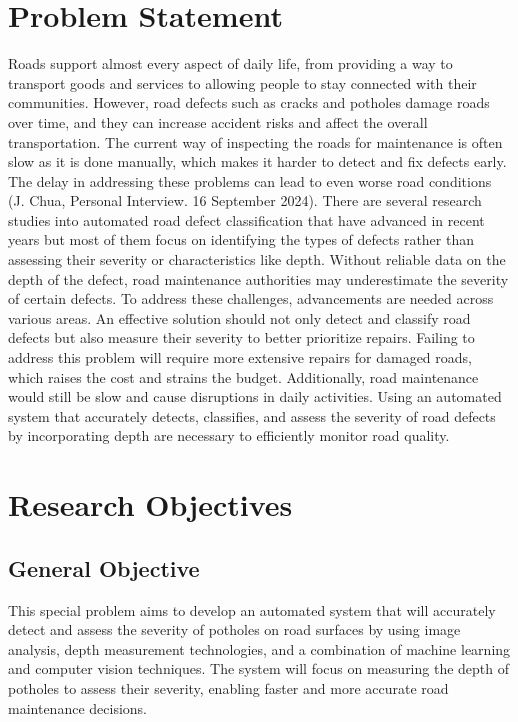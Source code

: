 \section{Problem Statement}
Roads support almost every aspect of daily life, from providing a way to transport goods and services to allowing people to stay connected with their communities. However, road defects such as cracks and potholes damage roads over time, and they can increase accident risks and affect the overall transportation. The current way of inspecting the roads for maintenance is often slow as it is done manually, which makes it harder to detect and fix defects early. The delay in addressing these problems can lead to even worse road conditions (J. Chua, Personal Interview. 16 September 2024). There are several research studies into automated road defect classification that have advanced in recent years but most of them focus on identifying the types of defects rather than assessing their severity or characteristics like depth. Without reliable data on the depth of the defect, road maintenance authorities may underestimate the severity of certain defects. To address these challenges, advancements are needed across various areas. An effective solution should not only detect and classify road defects but also measure their severity to better prioritize repairs. Failing to address this problem will require more extensive repairs for damaged roads, which raises the cost and strains the budget. Additionally, road maintenance would still be slow and cause disruptions in daily activities. Using an automated system that accurately detects, classifies, and assess the severity of road defects by incorporating depth are necessary to efficiently monitor road quality.


\section{Research Objectives}
\label{sec:researchobjectives}

\subsection{General Objective}
\label{sec:generalobjective}

This special problem aims to develop an automated system that will accurately detect and assess the severity of potholes on road surfaces by using image analysis, depth measurement technologies, and a combination of machine learning and computer vision techniques. The system will focus on measuring the depth of potholes to assess their severity, enabling faster and more accurate road maintenance decisions. 



